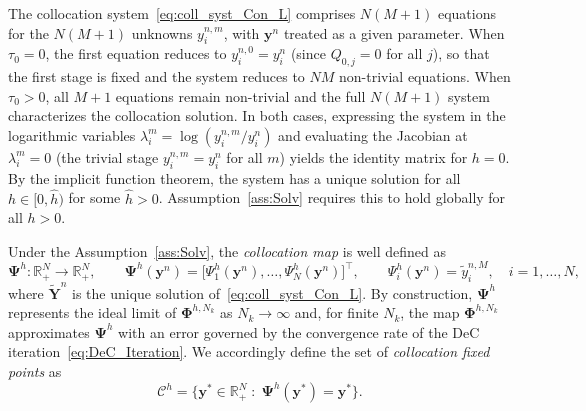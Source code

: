 \documentclass[a4paper,num-refs]{oup-contemporary-spidec}
\newtheorem{remark}[theorem]{Remark}
\begin{document}
The collocation system~\eqref{eq:coll_syst_Con_L} comprises $N(M+1)$ equations for the $N(M+1)$ unknowns $y_i^{n,m}$, with $\bm{y}^n$ treated as a given parameter. When $\tau_0=0$, the first equation reduces to $y_i^{n,0}=y_i^n$ (since $Q_{0,j}=0$ for all $j$), so that the first stage is fixed and the system reduces to $NM$ non-trivial equations. When $\tau_0>0$, all $M+1$ equations remain non-trivial and the full $N(M+1)$ system characterizes the collocation solution. In both cases, expressing the system in the logarithmic variables $\lambda_i^m=\log(y_i^{n,m}/y_i^n)$ and evaluating the Jacobian at $\lambda_i^m=0$ (the trivial stage $y_i^{n,m}=y_i^n$ for all $m$) yields the identity matrix for $h=0$. By the implicit function theorem, the system has a unique solution for all $h\in[0,\hat{h})$ for some $\hat{h}>0$. Assumption~\ref{ass:Solv} requires this to hold globally for all $h>0$.

Under the Assumption~\ref{ass:Solv}, the \emph{collocation map} is well defined as
\begin{equation}\label{eq:CollocationMap}
    \bm{\Psi}^h : \mathbb{R}_{+}^{N} \to \mathbb{R}_{+}^{N},
    \qquad
    \bm{\Psi}^h(\bm{y}^n) =
    \bigl[\Psi_1^h(\bm{y}^n),\dots,\Psi_N^h(\bm{y}^n)\bigr]^\top,
    \qquad
    \Psi_i^h(\bm{y}^n)=\tilde{y}_i^{n,M},
    \quad i=1,\dots,N,
\end{equation}
where $\tilde{\bm{Y}}^n$ is the unique solution of~\eqref{eq:coll_syst_Con_L}.
By construction, $\bm{\Psi}^h$ represents the ideal limit of $\bm{\Phi}^{h,N_k}$ as $N_k\to\infty$ and, for finite $N_k$, the map $\bm{\Phi}^{h,N_k}$ approximates $\bm{\Psi}^h$ with an error governed by the convergence rate of the DeC iteration~\eqref{eq:DeC_Iteration}. We accordingly define the set of \emph{collocation fixed points} as
\begin{equation*}
    \mathcal{C}^{h}
    =\bigl\{\bm{y}^*\in\mathbb{R}_{+}^{N}
      \;:\; \bm{\Psi}^{h}(\bm{y}^*)=\bm{y}^*\bigr\}.
\end{equation*}
\end{document}
